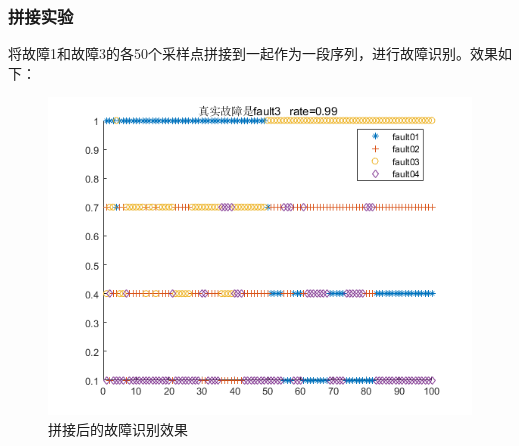 \documentclass[lang=cn,11pt,a4paper]{elegantpaper}
\begin{document}
\subsubsection{拼接实验}
将故障1和故障3的各50个采样点拼接到一起作为一段序列，进行故障识别。效果如下：
\begin{figure}[H] %
	\centering %
	\includegraphics[width=1.0\textwidth]{exp4_5} %
	\caption{拼接后的故障识别效果} %
	\label{Fig.main2} %
\end{figure}
\end{document}
